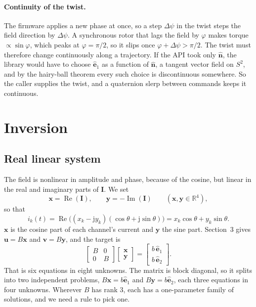 \documentclass[11pt]{article}
\newcommand{\R}{\mathbb{R}}
\newcommand{\vb}[1]{\mathbf{#1}}
\newcommand{\uv}[1]{\hat{\mathbf{#1}}}
\newcommand{\jj}{\mathrm{j}}
\renewcommand{\Re}{\operatorname{Re}}
\renewcommand{\Im}{\operatorname{Im}}
\begin{document}
\paragraph{Continuity of the twist.} The firmware applies a new phase at once, so a step
$\Delta\psi$ in the twist steps the field direction by $\Delta\psi$. A synchronous rotor that lags
the field by $\varphi$ makes torque $\propto\sin\varphi$, which peaks at $\varphi=\pi/2$, so it
slips once $\varphi+\Delta\psi>\pi/2$. The twist must therefore change continuously along a
trajectory. If the API took only $\uv n$, the library would have to choose $\uv e_1$ as a function
of $\uv n$, a tangent vector field on $S^2$, and by the hairy-ball theorem every such choice is
discontinuous somewhere. So the caller supplies the twist, and a quaternion slerp between
commands keeps it continuous.

\section{Inversion}

\subsection{Real linear system}
The field is nonlinear in amplitude and phase, because of the cosine, but linear in the real and
imaginary parts of $\vb I$. We set
\begin{equation}
  \vb x = \Re(\vb I),\qquad \vb y = -\Im(\vb I)\qquad(\vb x,\vb y\in\R^4),
\end{equation}
so that
\begin{equation}
  i_k(t) = \Re\big((x_k - \jj y_k)(\cos\theta + \jj\sin\theta)\big) = x_k\cos\theta + y_k\sin\theta .
\end{equation}
$\vb x$ is the cosine part of each channel's current and $\vb y$ the sine part. Section~3 gives
$\vb u = B\vb x$ and $\vb v = B\vb y$, and the target is
\begin{equation}
  \begin{bmatrix} B & 0\\ 0 & B\end{bmatrix}
  \begin{bmatrix}\vb x\\ \vb y\end{bmatrix}
  = \begin{bmatrix} b\,\uv e_1\\ b\,\uv e_2\end{bmatrix}.
\end{equation}
That is six equations in eight unknowns. The matrix is block diagonal, so it splits into two
independent problems, $B\vb x = b\uv e_1$ and $B\vb y = b\uv e_2$, each three equations in four
unknowns. Wherever $B$ has rank 3, each has a one-parameter family of solutions, and we need a
rule to pick one.
\end{document}
